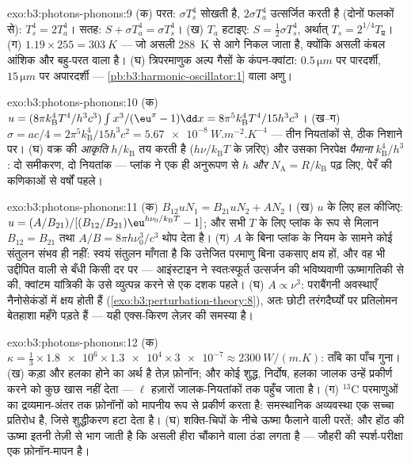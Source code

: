 \begin{solution}{exo:b3:photons-phonons:9}
(क) परत: $\sigma T_s^4$ सोखती है, $2\sigma T_a^4$ उत्सर्जित करती
है (दोनों फलकों से): $T_s^4 = 2T_a^4$। सतह: $S + \sigma T_a^4 = \sigma
T_s^4$। (ख) $T_a$ हटाइए: $S = \tfrac12\sigma T_s^4$, अर्थात्
$T_s = 2^{1/4}T_{\text{प्र}}$। (ग) $1.19 \times 255 =
\qty{303}{K}$ --- जो असली \qty{288}{K} से आगे निकल जाता है, क्योंकि
असली कंबल आंशिक और बहु-परत वाला है। (घ) त्रिपरमाणुक अल्प गैसों के
कंपन-क्वांटा: $0.5\,\unit{\micro m}$ पर पारदर्शी,
$15\,\unit{\micro m}$ पर अपारदर्शी ---
\cref{pb:b3:harmonic-oscillator:1} वाला अणु।
\end{solution}

\begin{solution}{exo:b3:photons-phonons:10}
(क) $u = (8\pi k_{\text{B}}^4T^4/h^3c^3)\int x^3/(\eu^x - 1)\dd x
= 8\pi^5k_{\text{B}}^4T^4/15h^3c^3$। (ख--ग) $\sigma = ac/4 =
2\pi^5k_{\text{B}}^4/15h^3c^2 = \qty{5.67e-8}{W.m^{-2}.K^{-4}}$
--- तीन नियतांकों से, ठीक निशाने पर। (घ) वक्र की \emph{आकृति}
$h/k_{\text{B}}$ तय करती है ($h\nu/k_{\text{B}}T$ के ज़रिए) और उसका
निरपेक्ष \emph{पैमाना} $k_{\text{B}}^4/h^3$: दो समीकरण,
दो नियतांक --- प्लांक ने एक ही अनुरूपण से $h$ \emph{और} $N_{\text{A}} =
R/k_{\text{B}}$ पढ़ लिए, पेरँ की कणिकाओं से वर्षों पहले।
\end{solution}

\begin{solution}{exo:b3:photons-phonons:11}
(क) $B_{12}uN_1 = B_{21}uN_2 + AN_2$। (ख) $u$ के लिए हल कीजिए:
$u = (A/B_{21})/[(B_{12}/B_{21})\eu^{h\nu_0/k_{\text{B}}T} - 1]$;
और सभी $T$ के लिए प्लांक के रूप से मिलान $B_{12} = B_{21}$ तथा
$A/B = 8\pi h\nu_0^3/c^3$ थोप देता है। (ग) $A$ के बिना
प्लांक के नियम के सामने कोई संतुलन संभव ही नहीं: स्वयं संतुलन
माँगता है कि उत्तेजित परमाणु बिना उकसाए क्षय हों, और वह भी उद्दीपित
वाली से बँधी किसी दर पर --- आइंस्टाइन ने स्वतःस्फूर्त उत्सर्जन की
भविष्यवाणी ऊष्मागतिकी से की, क्वांटम यांत्रिकी के उसे व्युत्पन्न
करने से एक दशक पहले। (घ) $A \propto
\nu^3$: पराबैंगनी अवस्थाएँ नैनोसेकंडों में क्षय होती हैं
(\cref{exo:b3:perturbation-theory:8}), अतः छोटी तरंगदैर्घ्यों पर
प्रतिलोमन बेतहाशा महँगे पड़ते हैं --- यही एक्स-किरण लेज़र की
समस्या है।
\end{solution}

\begin{solution}{exo:b3:photons-phonons:12}
(क) $\kappa = \tfrac13 \times \num{1.8e6} \times \num{1.3e4}
\times \num{3e-7} \approx \qty{2300}{W/(m.K)}$: ताँबे का पाँच
गुना। (ख) कड़ा और हलका होने का अर्थ है तेज़ फ़ोनॉन; और कोई शुद्ध,
निर्दोष, हलका जालक उन्हें प्रकीर्ण करने को कुछ खास नहीं देता ---
$\ell$ हज़ारों जालक-नियतांकों तक पहुँच जाता है। (ग)
$^{13}$C परमाणुओं का द्रव्यमान-अंतर तक फ़ोनॉनों को मापनीय रूप से
प्रकीर्ण करता है: समस्थानिक अव्यवस्था एक सच्चा प्रतिरोध है, जिसे
शुद्धीकरण हटा देता है। (घ) शक्ति-चिपों के नीचे ऊष्मा फैलाने वाली
परतें; और होंठ की ऊष्मा इतनी तेज़ी से भाग जाती है कि असली हीरा
चौंकाने वाला ठंडा लगता है --- जौहरी की स्पर्श-परीक्षा एक
फ़ोनॉन-मापन है।
\end{solution}

